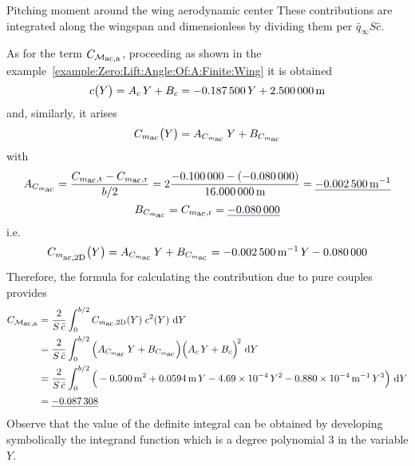 \documentclass[[12pt,twoside]{book}
\begin{document}
\begin{myExampleX}{Pitching moment around the wing aerodynamic center}{}
\noindent
These contributions are integrated along the wingspan and dimensionless by dividing them
per $\bar{q}_\infty S \bar{c}$.

As for the term $C_{\mathcal{M}_\mathlarger{\mathrm{ac,a}}}$,
proceeding as shown in the example~\ref{example:Zero:Lift:Angle:Of:A:Finite:Wing}
it is obtained
\[
c \big( Y \big) = A_c \, Y + B_c
  = \SI[round-precision=3]{\myCoeffAChordWing}{} \, Y
    + \SI[round-precision=2]{\myCoeffBChordWingMT}{\metre}
\]
and, similarly, it arises
\[
C_{m_\mathlarger{\mathrm{ac}}} \big( Y \big) 
  = A_{C_{m_\mathlarger{\mathrm{ac}}}} \, Y + B_{C_{m_\mathlarger{\mathrm{ac}}}}
\]
with
\[
A_{C_{m_\mathlarger{\mathrm{ac}}}}
  = \frac{C_{m_\mathlarger{\mathrm{ac}},\mathrm{t}} 
    - C_{m_\mathlarger{\mathrm{ac}},\mathrm{r}}}{b/2}
  = 
    2 \frac{
      \SI[round-precision=3]{\myCmZeroTipWing}{} 
      - ( \SI[round-precision=3]{\myCmZeroRootWing}{} )
    }{
      \SI[round-precision=2]{\mySpanWingMT}{\metre}
    }
  = 
    \mathunderline{mydarkblue}{ 
      \SI[round-precision=5]{\myCoeffACmZeroWingMT}{\metre^{-1}} 
    }
\]
\[
B_{C_{m_\mathlarger{\mathrm{ac}}}}
  = C_{m_\mathlarger{\mathrm{ac}},\mathrm{r}}
  = \mathunderline{mydarkblue}{ \SI[round-precision=3]{\myCoeffBCmZeroWing}{} }
\]
i.e.
\[
C_{m_\mathlarger{\mathrm{ac,2D}}} \big( Y \big) 
  = A_{C_{m_\mathlarger{\mathrm{ac}}}} \, Y + B_{C_{m_\mathlarger{\mathrm{ac}}}}
  = \SI[round-precision=5]{\myCoeffACmZeroWingMT}{\metre^{-1}} \, Y
    \SI[round-precision=3]{\myCoeffBCmZeroWing}{}
\]
%
Therefore, the formula for calculating the contribution due to pure couples provides
\[
\begin{split}
C_{\mathcal{M}_\mathlarger{\mathrm{ac,a}}}
  & {}= \frac{2}{S\,\bar{c}} \int_0^{b/2} 
    C_{m_\mathlarger{\mathrm{ac}},\mathrm{2D}}(Y) \; c^2(Y)\, \diff{Y}
\\
  & {}= 
  \frac{2}{S\,\bar{c}} \int_0^{b/2} 
    \Big( 
      A_{C_{m_\mathlarger{\mathrm{ac}}}} \, Y + B_{C_{m_\mathlarger{\mathrm{ac}}}} 
    \Big)
    \Big( A_c \, Y + B_c \Big)^{\! 2}
    \, \diff{Y}
\\
  & {}= 
  \frac{2}{S\,\bar{c}} \int_0^{b/2} 
    \Big( 
      \SI[round-mode=figures,round-precision=3,
        fixed-exponent=0,scientific-notation=fixed]{\myCoeffAWing}{\metre^2}
      + 
      \SI[round-mode=figures,round-precision=3,
        ]{\myCoeffBWing}{\metre}\, Y
      \SI[round-mode=figures,round-precision=3,
        fixed-exponent=-4,
        scientific-notation=fixed %
        ]{\myCoeffCWing}{}\, Y^2
      \SI[round-mode=figures,round-precision=3,
        fixed-exponent=-4,
        scientific-notation=fixed
        ]{\myCoeffDWing}{\metre^{-1}}\, Y^3
    \Big)
    \, \diff{Y}
\\
  & {}= \mathunderline{mydarkblue}{ \SI[round-precision=4]{\myCmZeroAWing}{} }
\end{split}
\]
Observe that the value of the definite integral can be obtained by developing symbolically
the integrand function which is a degree polynomial $3$ in the variable $Y$.


\end{myExampleX}
\end{document}
